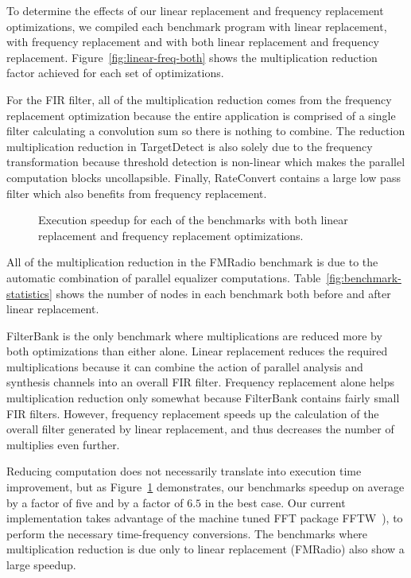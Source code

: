 To determine the effects of our linear replacement and frequency replacement 
optimizations, we compiled each benchmark program with linear 
replacement, with frequency replacement and with both linear 
replacement and frequency replacement. 
Figure~\ref{fig:linear-freq-both} shows the multiplication reduction factor 
achieved for each set of optimizations.

For the FIR filter, all of the multiplication reduction comes from the frequency
replacement optimization because the entire application is comprised of a single
filter calculating a convolution sum so there is nothing to combine.
The reduction multiplication reduction in TargetDetect is also solely due to 
the frequency transformation because threshold detection is non-linear which
makes the parallel computation blocks uncollapsible. Finally, RateConvert contains
a large low pass filter which also benefits from frequency replacement. 


\begin{figure}[t]
\vspace{-6pt}
\center
\epsfxsize=3.2in
\vspace{-6pt}
\caption{Execution speedup for each of the benchmarks with both linear replacement and frequency replacement optimizations.}
\label{fig:execution-speedup}
\vspace{-12pt}
\end{figure}

All of the multiplication reduction in the FMRadio benchmark is due to
the automatic combination of parallel equalizer computations.
Table~\ref{fig:benchmark-statistics} shows the number of nodes in each
benchmark both before and after linear replacement.

FilterBank is the only benchmark where multiplications are reduced  
more by both optimizations than either alone. Linear replacement reduces
the required multiplications because it can combine the action of parallel analysis 
and synthesis channels into an overall FIR filter. Frequency replacement alone helps 
multiplication reduction only somewhat because FilterBank contains fairly small FIR filters.
However, frequency replacement speeds up the calculation of the overall filter
generated by linear replacement, and thus decreases the number of multiplies even further.

Reducing computation does not necessarily translate into execution time improvement, but as
Figure~\ref{fig:execution-speedup} demonstrates, our benchmarks speedup on average by a factor of five 
and by a factor of $6.5$ in the best case. Our current implementation takes advantage of the machine tuned 
FFT package FFTW~\cite{frigo99fast}), to perform the necessary time-frequency conversions. 
The benchmarks where multiplication reduction is due only to linear replacement (FMRadio) 
also show a large speedup.

